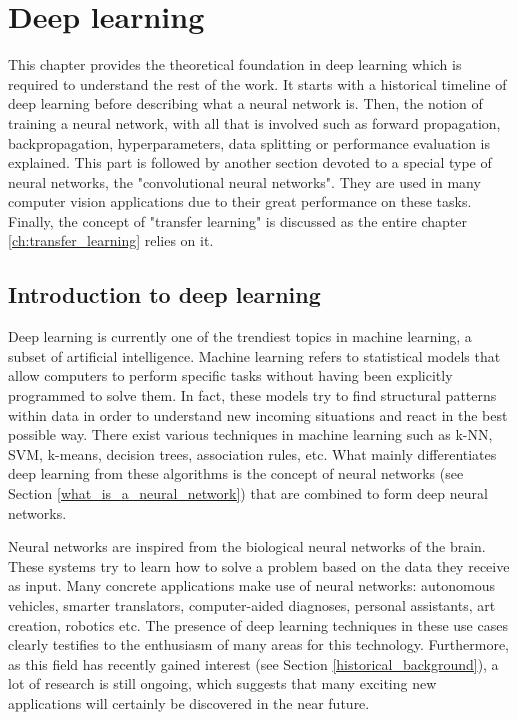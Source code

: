 
\chapter{Deep learning}
\label{ch:deep_learning}
\setlength{\marginparwidth}{3cm}\leavevmode {}This chapter provides the theoretical foundation in deep learning which is required to understand the rest of the work. It starts with a historical timeline of deep learning before describing what a neural network is. Then, the notion of training a neural network, with all that is involved such as forward propagation, backpropagation, hyperparameters, data splitting or performance evaluation is explained. This part is followed by another section devoted to a special type of neural networks, the "convolutional neural networks". They are used in many computer vision applications due to their great performance on these tasks. Finally, the concept of "transfer learning" is discussed as the entire chapter \ref{ch:transfer_learning} relies on it.


\section{Introduction to deep learning}
\setlength{\marginparwidth}{3cm}\leavevmode {}Deep learning is currently one of the trendiest topics in machine learning, a subset of artificial intelligence. Machine learning refers to statistical models that allow computers to perform specific tasks without having been explicitly programmed to solve them. In fact, these models try to find structural patterns within data in order to understand new incoming situations and react in the best possible way. There exist various techniques in machine learning such as k-NN, SVM, k-means, decision trees, association rules, etc. What mainly differentiates deep learning from these algorithms is the concept of neural networks (see Section  \ref{what_is_a_neural_network}) that are combined to form deep neural networks.

Neural networks are inspired from the biological neural networks of the brain. These systems try to learn how to solve a problem based on the data they receive as input. Many concrete applications make use of neural networks: autonomous vehicles, smarter translators, computer-aided diagnoses, personal assistants, art creation, robotics etc. The presence of deep learning techniques in these use cases clearly testifies to the enthusiasm of many areas for this technology. Furthermore, as this field has recently gained interest (see Section \ref{historical_background}), a lot of research is still ongoing, which suggests that many exciting new applications will certainly be discovered in the near future.

